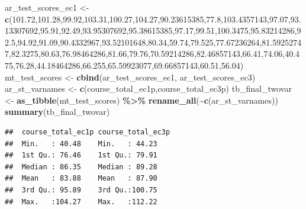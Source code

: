 \documentclass[
]{book}
\newenvironment{Shaded}{\begin{snugshade}}{\end{snugshade}}
\newcommand{\FloatTok}[1]{\textcolor[rgb]{0.00,0.00,0.81}{#1}}
\newcommand{\KeywordTok}[1]{\textcolor[rgb]{0.13,0.29,0.53}{\textbf{#1}}}
\newcommand{\NormalTok}[1]{#1}
\newcommand{\OperatorTok}[1]{\textcolor[rgb]{0.81,0.36,0.00}{\textbf{#1}}}
\newcommand{\StringTok}[1]{\textcolor[rgb]{0.31,0.60,0.02}{#1}}
\begin{document}
\begin{Shaded}
\begin{Highlighting}[]
\NormalTok{ar\_test\_scores\_ec1 \textless{}{-}}\StringTok{ }\KeywordTok{c}\NormalTok{(}\FloatTok{101.72}\NormalTok{,}\FloatTok{101.28}\NormalTok{,}\FloatTok{99.92}\NormalTok{,}\FloatTok{103.31}\NormalTok{,}\FloatTok{100.27}\NormalTok{,}\FloatTok{104.27}\NormalTok{,}\FloatTok{90.23615385}\NormalTok{,}\FloatTok{77.8}\NormalTok{,}\FloatTok{103.4357143}\NormalTok{,}\FloatTok{97.07}\NormalTok{,}\FloatTok{93.13307692}\NormalTok{,}\FloatTok{95.91}\NormalTok{,}\FloatTok{92.49}\NormalTok{,}\FloatTok{93.95307692}\NormalTok{,}\FloatTok{95.38615385}\NormalTok{,}\FloatTok{97.17}\NormalTok{,}\FloatTok{99.51}\NormalTok{,}\FloatTok{100.3475}\NormalTok{,}\FloatTok{95.83214286}\NormalTok{,}\FloatTok{92.5}\NormalTok{,}\FloatTok{94.92}\NormalTok{,}\FloatTok{91.09}\NormalTok{,}\FloatTok{90.4332967}\NormalTok{,}\FloatTok{93.52101648}\NormalTok{,}\FloatTok{80.34}\NormalTok{,}\FloatTok{59.74}\NormalTok{,}\FloatTok{79.525}\NormalTok{,}\FloatTok{77.67236264}\NormalTok{,}\FloatTok{81.59252747}\NormalTok{,}\FloatTok{82.3275}\NormalTok{,}\FloatTok{80.63}\NormalTok{,}\FloatTok{76.98464286}\NormalTok{,}\FloatTok{81.66}\NormalTok{,}\FloatTok{79.76}\NormalTok{,}\FloatTok{70.59214286}\NormalTok{,}\FloatTok{82.46857143}\NormalTok{,}\FloatTok{66.41}\NormalTok{,}\FloatTok{74.06}\NormalTok{,}\FloatTok{40.475}\NormalTok{,}\FloatTok{76.28}\NormalTok{,}\FloatTok{44.18464286}\NormalTok{,}\FloatTok{66.255}\NormalTok{,}\FloatTok{65.59923077}\NormalTok{,}\FloatTok{69.66857143}\NormalTok{,}\FloatTok{60.51}\NormalTok{,}\FloatTok{56.04}\NormalTok{)}
\NormalTok{mt\_test\_scores \textless{}{-}}\StringTok{ }\KeywordTok{cbind}\NormalTok{(ar\_test\_scores\_ec1, ar\_test\_scores\_ec3)}
\NormalTok{ar\_st\_varnames \textless{}{-}}\StringTok{ }\KeywordTok{c}\NormalTok{(}\StringTok{\textquotesingle{}course\_total\_ec1p\textquotesingle{}}\NormalTok{,}\StringTok{\textquotesingle{}course\_total\_ec3p\textquotesingle{}}\NormalTok{)}
\NormalTok{tb\_final\_twovar \textless{}{-}}\StringTok{ }\KeywordTok{as\_tibble}\NormalTok{(mt\_test\_scores) }\OperatorTok{\%\textgreater{}\%}\StringTok{ }\KeywordTok{rename\_all}\NormalTok{(}\OperatorTok{\textasciitilde{}}\KeywordTok{c}\NormalTok{(ar\_st\_varnames))}
\KeywordTok{summary}\NormalTok{(tb\_final\_twovar)}
\end{Highlighting}
\end{Shaded}

\begin{verbatim}
##  course_total_ec1p course_total_ec3p
##  Min.   : 40.48    Min.   : 44.23   
##  1st Qu.: 76.46    1st Qu.: 79.91   
##  Median : 86.35    Median : 89.28   
##  Mean   : 83.88    Mean   : 87.90   
##  3rd Qu.: 95.89    3rd Qu.:100.75   
##  Max.   :104.27    Max.   :112.22
\end{verbatim}
\end{document}
